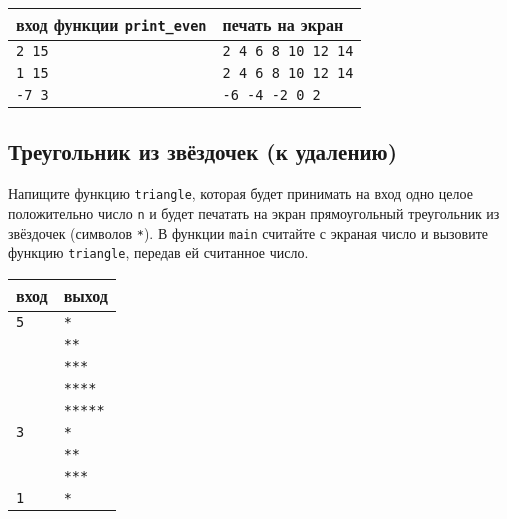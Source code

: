 \documentclass{article}
\begin{document}
\begin{center}
\begin{tabular}{ l | l }
 вход функции \texttt{print\_even} & печать на экран \\ \hline
 \texttt{2 15} & \texttt{2 4 6 8 10 12 14}  \\
 \texttt{1 15} & \texttt{2 4 6 8 10 12 14}  \\  
 \texttt{-7 3} & \texttt{-6 -4 -2 0 2}  \\
\end{tabular}
\end{center}

\newpage
\subsection{Треугольник из звёздочек (к удалению)}
Напищите функцию \texttt{triangle}, которая будет принимать на вход одно целое положительно число \texttt{n} и будет печатать на экран прямоугольный треугольник из звёздочек (символов \texttt{*}). В функции \texttt{main} считайте с экраная число и вызовите функцию \texttt{triangle}, передав ей считанное число.

\begin{center}
\begin{tabular}{ l | l }
 вход & выход \\ \hline
 \texttt{5} & \texttt{*}  \\  
            & \texttt{**} \\ 
            & \texttt{***} \\ 
            & \texttt{****} \\
            & \texttt{*****} \\ \hline
 \texttt{3} & \texttt{*}  \\  
            & \texttt{**} \\  
            & \texttt{***} \\ \hline
 \texttt{1} & \texttt{*}  \\
\end{tabular}
\end{center}
\end{document}
